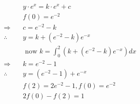\documentclass[10pt]{article}
\begin{document}
\[
\begin{array}{ll} 
& y \cdot e^{x}=k \cdot e^{x}+c \\
& f(0)=e^{-2} \\
\Rightarrow \quad & c=e^{-2}-k \\
\therefore \quad & y=k+\left(e^{-2}-k\right) e^{-x} \\
& \text { now } k=\int_{0}^{2}\left(k+\left(e^{-2}-k\right) e^{-x}\right) d x \\
\Rightarrow \quad & k=e^{-2}-1 \\
\therefore \quad & y=\left(e^{-2}-1\right)+e^{-x} \\
& f(2)=2 e^{-2}-1, f(0)=e^{-2} \\
& 2 f(0)-f(2)=1
\end{array}
\]
\end{document}
